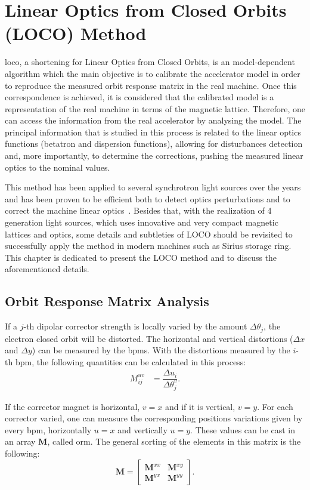 \chapter{Linear Optics from Closed Orbits (LOCO) Method}

\gls{loco}, a shortening for Linear Optics from Closed Orbits, is an model-dependent algorithm which the main objective is to calibrate the accelerator model in order to reproduce the measured orbit response matrix in the real machine. Once this correspondence is achieved, it is considered that the calibrated model is a representation of the real machine in terms of the magnetic lattice. Therefore, one can access the information from the real accelerator by analysing the model. The principal information that is studied in this process is related to the linear optics functions (betatron and dispersion functions), allowing for disturbances detection and, more importantly, to determine the corrections, pushing the measured linear optics to the nominal values.

This method has been applied to several synchrotron light sources over the years and has been proven to be efficient both to detect optics perturbations and to correct the machine linear optics~\cite{safranek1997, icfa_laurent, icfa_australia}. Besides that, with the realization of 4 generation light sources, which uses innovative and very compact magnetic lattices and optics, some details and subtleties of LOCO should be revisited to successfully apply the method in modern machines such as Sirius storage ring. This chapter is dedicated to present the LOCO method and to discuss the aforementioned details.
\section{Orbit Response Matrix Analysis}\label{sec:orm_analysis}
If a $j$-th dipolar corrector strength is locally varied by the amount $\Delta \theta_j$, the electron closed orbit will be distorted. The horizontal and vertical distortions ($\Delta x$ and $\Delta y$) can be measured by the \gls{bpm}s. With the distortions measured by the $i$-th \gls{bpm}, the following quantities can be calculated in this process:
\begin{align}
    M^{uv}_{ij} &= \dfrac{\Delta u_i}{\Delta \theta_j^v}.
\end{align}

If the corrector magnet is horizontal, $v=x$ and if it is vertical, $v=y$. For each corrector varied, one can measure the corresponding positions variations given by every \gls{bpm}, horizontally $u=x$ and vertically $u=y$. These values can be cast in an array $\mathbf{M}$, called \gls{orm}. The general sorting of the elements in this matrix is the following:
\begin{equation}
    \mathbf{M} = \begin{bmatrix}
    \mathbf{M}^{xx} & \mathbf{M}^{xy} \\
    \mathbf{M}^{yx} & \mathbf{M}^{yy} 
\end{bmatrix}.
\end{equation}

